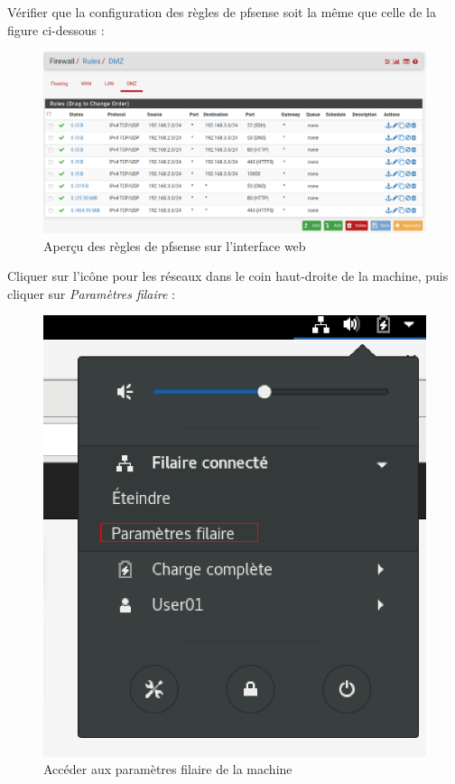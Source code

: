 Vérifier que la configuration des règles de pfsense soit la même que celle de la figure ci-dessous :
  \begin{figure}[h!]
     \begin{center}
         \includegraphics[scale=0.5]{Debian_screenshots/Config/15.png}
         \caption{Aperçu des règles de pfsense sur l'interface web}
         \label{Debian_screenshots/Config/15}
     \end{center}
  \end{figure}
  \FloatBarrier

\pagebreak
Cliquer sur l'icône pour les réseaux dans le coin haut-droite de la machine, puis cliquer sur \textit{Paramètres filaire} :
  \begin{figure}[h!]
     \begin{center}
         \includegraphics[scale=0.55]{Debian_screenshots/Config/16.png}
         \caption{Accéder aux paramètres filaire de la machine}
         \label{Debian_screenshots/Config/16}
     \end{center}
  \end{figure}
  \FloatBarrier

